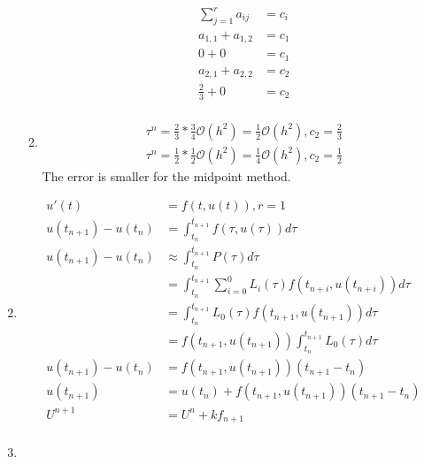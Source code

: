 \documentclass{article}
\begin{document}
\begin{enumerate}
\begin{enumerate}
\begin{equation*}
\begin{split}
		\end{split}
		\end{equation*}
		\begin{equation*}
		\begin{split}
		\sum_{j=1}^{r} a_{ij} & = c_{i} \\
		 a_{1,1}+a_{1,2} & = c_{1} \\
		0+0 & = c_{1} \\
		a_{2,1} + a_{2,2} & = c_{2} \\
		\frac{2}{3} + 0 & = c_{2} \\
		\end{split}
		\end{equation*}
	\item
		\begin{equation*}
		\begin{split}
			\tau^{n} = \frac{2}{3}*\frac{3}{4} \mathcal{O}(h^{2}) = \frac{1}{2}\mathcal{O}(h^{2}), c_{2} = \frac{2}{3} \\ 
			\tau^{n} = \frac{1}{2}*\frac{1}{2} \mathcal{O}(h^{2}) = \frac{1}{4}\mathcal{O}(h^{2}), c_{2} = \frac{1}{2} 
		\end{split}
		\end{equation*}
		The error is smaller for the midpoint method. 
	\end{enumerate}
\item
	\begin{equation*}
	\begin{split}
	u'(t) & = f(t,u(t)), r = 1 \\
	u(t_{n+1}) - u(t_{n}) & = \int_{t_{n}}^{t_{n+1}} f(\tau,u(\tau))d\tau \\
	u(t_{n+1}) - u(t_{n}) & \approx \int_{t_{n}}^{t_{n+1}} P(\tau) d\tau \\
	& =  \int_{t_{n}}^{t_{n+1}} \sum_{i=0}^{0} L_{i}(\tau)f(t_{n+i},u(t_{n+i})) d\tau \\
	& = \int_{t_{n}}^{t_{n+1}} L_{0}(\tau)f(t_{n+1},u(t_{n+1})) d\tau \\
	& = f(t_{n+1},u(t_{n+1})) \int_{t_{n}}^{t_{n+1}} L_{0}(\tau) d\tau \\
	u(t_{n+1})  - u(t_{n}) & = f(t_{n+1},u(t_{n+1}))(t_{n+1}-t_{n}) \\
	u(t_{n+1})  & =u(t_{n})+ f(t_{n+1},u(t_{n+1}))(t_{n+1}-t_{n}) \\
	U^{n+1} & = U^{n} + k f_{n+1} \\
	\end{split}
	\end{equation*}
\item
	\begin{enumerate}

\end{enumerate}
\end{enumerate}
\end{document}
